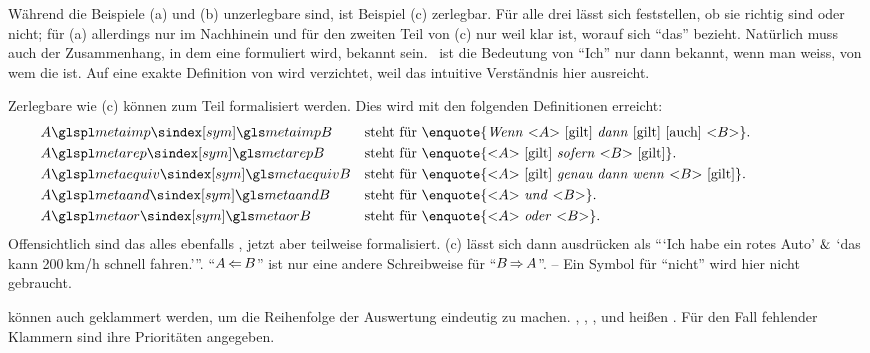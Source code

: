 Während die Beispiele (a) und (b) unzerlegbare  sind, ist Beispiel (c) zerlegbar.
Für alle drei  lässt sich feststellen, ob sie richtig sind oder nicht;
für (a) allerdings nur im Nachhinein und für den zweiten Teil von (c) nur weil klar ist, worauf sich \enquote{das} bezieht.
Natürlich muss auch der Zusammenhang, in dem eine  formuliert wird, bekannt sein.
\textZB\ ist die Bedeutung von \enquote{Ich} nur dann bekannt, wenn man weiss, von wem die  ist.
Auf eine exakte Definition von  wird verzichtet, weil das intuitive Verständnis hier ausreicht.

Zerlegbare  wie (c) können zum Teil formalisiert werden.
Dies wird mit den folgenden Definitionen erreicht:
\begin{align}
	& A \glsSym{metaimp}   B & \text{steht für }
	& \text{\enquote{\emph{Wenn} \objqt{A} [gilt] \emph{dann} [gilt] [auch] \objqt{B}}.}
	\\
	& A \glsSym{metarep}   B & \text{steht für }
	& \text{\enquote{\objqt{A} [gilt] \emph{sofern}          \objqt{B} [gilt]}.}
	\\
	& A \glsSym{metaequiv} B & \text{steht für }
	& \text{\enquote{\objqt{A} [gilt] \emph{genau dann wenn} \objqt{B} [gilt]}.}
	\\
	& A \glsSym{metaand}   B & \text{steht für }
	& \text{\enquote{\objqt{A} \emph{und}  \objqt{B}}.}
	\\
	& A \glsSym{metaor}    B & \text{steht für }
	& \text{\enquote{\objqt{A} \emph{oder} \objqt{B}}.}
	\formulatoleft
\end{align}
Offensichtlich sind das alles ebenfalls , jetzt aber teilweise formalisiert.
(c) lässt sich dann ausdrücken als \enquote{\enquote{Ich habe ein rotes Auto} $\operatorname{\&}$ \enquote{das kann 200\,km/h schnell fahren.}}.
\enquote{$A \operatorname{\Leftarrow} B$} ist nur eine andere Schreibweise für \enquote{$B \operatorname{\Rightarrow} A$}.
-- Ein Symbol für \enquote{nicht} wird hier nicht gebraucht.

 können auch geklammert werden, um die Reihenfolge der Auswertung eindeutig zu machen.
\objqt{\metaimp}, \objqt{\metarep}, \objqt{\metaequiv}, \objqt{\metaandsym} und \objqt{\metaorsym} heißen \emph{}. %
Für den Fall fehlender Klammern sind ihre Prioritäten  angegeben.

